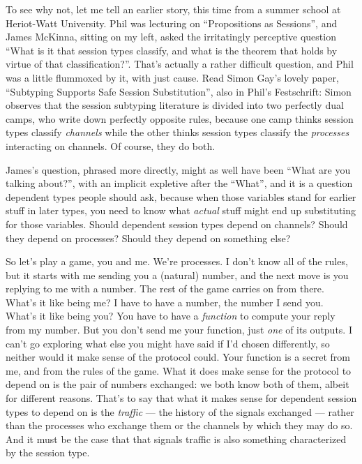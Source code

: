 \documentclass{book}
\begin{document}
To see why not, let me tell an earlier story, this time from a summer school at Heriot-Watt University. Phil was lecturing on ``Propositions as Sessions'', and James McKinna, sitting on my left, asked the irritatingly perceptive question  ``What is it that session types classify, and what is the theorem that holds by virtue of that classification?''. That's actually a rather difficult question, and Phil was a little flummoxed by it, with just cause. Read Simon Gay's lovely paper, ``Subtyping Supports Safe Session Substitution'', also in Phil's Festschrift: Simon observes that the session subtyping literature is divided into two perfectly dual camps, who write down perfectly opposite rules, because one camp thinks session types classify \emph{channels} while the other thinks session types classify the \emph{processes} interacting on channels. Of course, they do both.

James's question, phrased more directly, might as well have been ``What are you talking about?'', with an implicit expletive after the ``What'', and it is a question dependent types people should ask, because when those variables stand for earlier stuff in later types, you need to know what \emph{actual} stuff might end up substituting for those variables. Should dependent session types depend on channels? Should they depend on processes? Should they depend on something else?

So let's play a game, you and me. We're processes. I don't know all of the rules, but it starts with me sending you a (natural) number, and the next move is you replying to me with a number. The rest of the game carries on from there. What's it like being me? I have to have a number, the number I send you. What's it like being you? You have to have a \emph{function} to compute your reply from my number. But you don't send me your function, just \emph{one} of its outputs. I can't go exploring what else you might have said if I'd chosen differently, so neither would it make sense of the protocol could. Your function is a secret from me, and from the rules of the game. What it does make sense for the protocol to depend on is the pair of numbers exchanged: we both know both of them, albeit for different reasons. That's to say that what it makes sense for dependent session types to depend on is the \emph{traffic} --- the history of the signals exchanged --- rather than the processes who exchange them or the channels by which they may do so. And it must be the case that that signals traffic is also something characterized by the session type.
\end{document}
